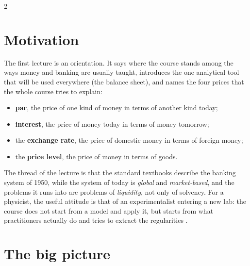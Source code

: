\begin{paracol}{2}
\section*{Motivation}
The first lecture is an orientation. It says where the course stands among the ways money and banking
are usually taught, introduces the one analytical tool that will be used everywhere (the balance sheet),
and names the four prices that the whole course tries to explain:
\begin{itemize}
  \item \textbf{par}, the price of one kind of money in terms of another kind today;
  \item \textbf{interest}, the price of money today in terms of money tomorrow;
  \item the \textbf{exchange rate}, the price of domestic money in terms of foreign money;
  \item the \textbf{price level}, the price of money in terms of goods.
\end{itemize}
The thread of the lecture is that the standard textbooks describe the banking system of 1950, while
the system of today is \emph{global} and \emph{market-based}, and the problems it runs into are
problems of \emph{liquidity}, not only of solvency. For a physicist, the useful attitude is that of an
experimentalist entering a new lab: the course does not start from a model and apply it, but starts
from what practitioners actually do and tries to extract the regularities .

\section{The big picture}\label{sec:fp-bigpicture}


\end{paracol}
